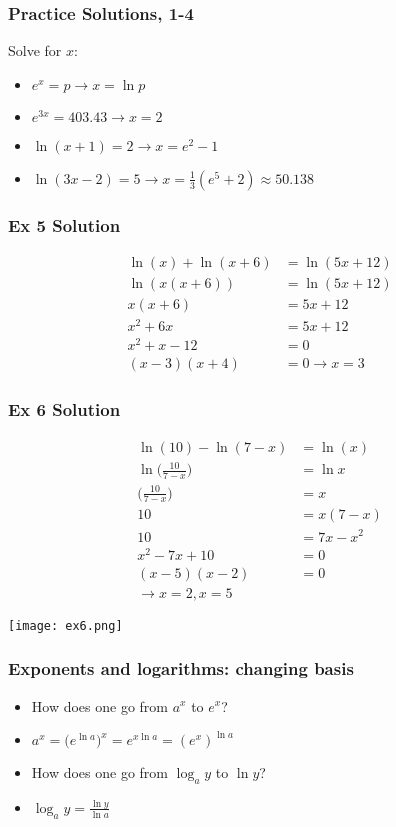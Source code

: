 \documentclass[xcolor=dvipsnames]{beamer} %
\begin{document}
\begin{frame}
\frametitle{Practice Solutions, 1-4}
Solve for $x$:
\begin{itemize}
\setlength\itemsep{1em}
\item $e^x = p \rightarrow x = \ln p$
\item $e^{3x} = 403.43 \rightarrow x = 2$
\item $\ln (x + 1) = 2 \rightarrow x = e^2 - 1$
\item $\ln (3x-2) = 5 \rightarrow x = \frac{1}{3} (e^5 + 2) \approx 50.138$
\end{itemize}
\end{frame}

\begin{frame}
\frametitle{Ex 5 Solution}
\begin{align*}
\ln(x) + \ln(x+6) &= \ln(5x+12) \\
\ln(x(x+6)) &= \ln (5x + 12) \\
x(x+6) &= 5x+12 \\
x^2 + 6x &= 5x + 12 \\
x^2 + x - 12 &= 0 \\
(x - 3)(x +4) &= 0 \rightarrow x = 3
\end{align*}
\end{frame}

\begin{frame}
\frametitle{Ex 6 Solution}
\begin{scriptsize}
\begin{flushright}
\begin{align*}
\ln(10) - \ln(7-x) &= \ln(x) \\
\ln \bigg( \frac{10}{7-x} \bigg) &= \ln x \\
\bigg( \frac{10}{7-x} \bigg) &= x \\
10 &= x(7-x) \\
10 &= 7x - x^2 \\
x^2 - 7x + 10 &= 0 \\
(x - 5)(x-2) &= 0\\ 
\rightarrow x = 2, x = 5 
\end{align*}
\end{flushright}
\vspace{-0.5cm}
\end{scriptsize}
\begin{flushleft} \texttt{[image: ex6.png]} \end{flushleft}
\end{frame}

\begin{frame}
\frametitle{Exponents and logarithms: changing basis}
\begin{itemize}
    \setlength\itemsep{1em}
\item How does one go from \textcolor{dark_red}{$a^x$} to \textcolor{dark_red}{$e^x$}?
\item[] $a^x = \big( e^{\ln a} \big)^x = e^{x \ln a} = (e^x)^{\ln a}$
\item How does one go from $\log_a y$ to $\ln y$?
\item[] $\log_a y = \frac{\ln y}{\ln a}$
\end{itemize}
\end{frame}
\end{document}
